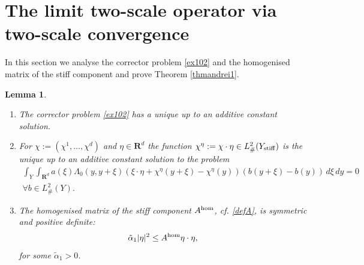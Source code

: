 \documentclass[11pt]{article}
\newcommand\stiff{{\rm stiff}}
\newcommand{\R}{\mathbf{R}}
\def\hom{{\rm hom}}
\newtheorem{lemma}[theorem]{Lemma}
\theoremstyle{remark}
\begin{document}
\section{The limit two-scale operator via two-scale convergence}
\label{two-scalecon}
In this section we analyse the corrector problem \eqref{ex102} and the homogenised matrix of the stiff component and prove Theorem \ref{thmandrei1}.


\begin{lemma} \label{lmdefA} $\left.\right.$
	
	\begin{enumerate}
		\item The corrector problem \eqref{ex102} has a unique up to an additive  constant solution.
		\item For $\chi:=(\chi^1,\dots,\chi^d)$ and $\eta \in \R^d$ the function  $ \chi^\eta:=\chi\cdot\eta\in L^2_\#(Y_\stiff)$ is the unique up to an additive constant solution to the problem
			\begin{multline} \label{ex102nak1}
				\int_{Y} \int_{\R^d} a(\xi) \Lambda_0 (y,y+\xi)\left(\xi \cdot \eta+\chi^\eta(y+\xi)-\chi^\eta(y) \right)\left(b(y+\xi)-b(y) \right) \,d\xi\, dy=0
				\\
				\forall b \in L^2_\#(Y).
			\end{multline}
		\item The homogenised matrix of the stiff component $A^\hom $, cf. \eqref{defA}, is  symmetric and positive definite:
\begin{equation*} %
			\tilde{\alpha}_1 |\eta|^2  \leq   A^{\rm hom} \eta \cdot \eta,
\end{equation*}
		for some $\tilde{\alpha}_1 >0$.
		
	\end{enumerate}
\end{lemma} 	
\end{document}
